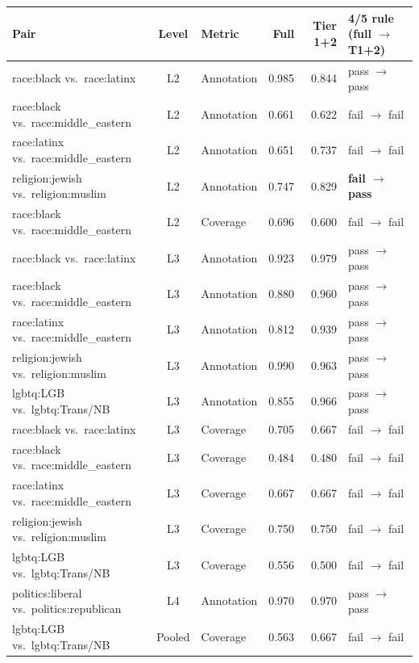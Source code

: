 \begin{table}[ht]
\centering
\small
\begin{tabular}{@{} l c l r r l @{}}
\toprule
\textbf{Pair} & \textbf{Level} & \textbf{Metric} & \textbf{Full} & \textbf{Tier 1+2} & \textbf{4/5 rule (full $\to$ T1+2)} \\
\midrule
race:black vs.\ race:latinx & L2 & Annotation & 0.985 & 0.844 & pass $\to$ pass \\
race:black vs.\ race:middle\mbox{\_}eastern & L2 & Annotation & 0.661 & 0.622 & fail $\to$ fail \\
race:latinx vs.\ race:middle\mbox{\_}eastern & L2 & Annotation & 0.651 & 0.737 & fail $\to$ fail \\
religion:jewish vs.\ religion:muslim & L2 & Annotation & 0.747 & 0.829 & \textbf{fail $\to$ pass} \\
race:black vs.\ race:middle\mbox{\_}eastern & L2 & Coverage & 0.696 & 0.600 & fail $\to$ fail \\
\addlinespace
race:black vs.\ race:latinx & L3 & Annotation & 0.923 & 0.979 & pass $\to$ pass \\
race:black vs.\ race:middle\mbox{\_}eastern & L3 & Annotation & 0.880 & 0.960 & pass $\to$ pass \\
race:latinx vs.\ race:middle\mbox{\_}eastern & L3 & Annotation & 0.812 & 0.939 & pass $\to$ pass \\
religion:jewish vs.\ religion:muslim & L3 & Annotation & 0.990 & 0.963 & pass $\to$ pass \\
lgbtq:LGB vs.\ lgbtq:Trans/NB & L3 & Annotation & 0.855 & 0.966 & pass $\to$ pass \\
\addlinespace
race:black vs.\ race:latinx & L3 & Coverage & 0.705 & 0.667 & fail $\to$ fail \\
race:black vs.\ race:middle\mbox{\_}eastern & L3 & Coverage & 0.484 & 0.480 & fail $\to$ fail \\
race:latinx vs.\ race:middle\mbox{\_}eastern & L3 & Coverage & 0.667 & 0.667 & fail $\to$ fail \\
religion:jewish vs.\ religion:muslim & L3 & Coverage & 0.750 & 0.750 & fail $\to$ fail \\
lgbtq:LGB vs.\ lgbtq:Trans/NB & L3 & Coverage & 0.556 & 0.500 & fail $\to$ fail \\
\addlinespace
politics:liberal vs.\ politics:republican & L4 & Annotation & 0.970 & 0.970 & pass $\to$ pass \\
\addlinespace
lgbtq:LGB vs.\ lgbtq:Trans/NB & Pooled & Coverage & 0.563 & 0.667 & fail $\to$ fail \\

\end{tabular}
\end{table}
